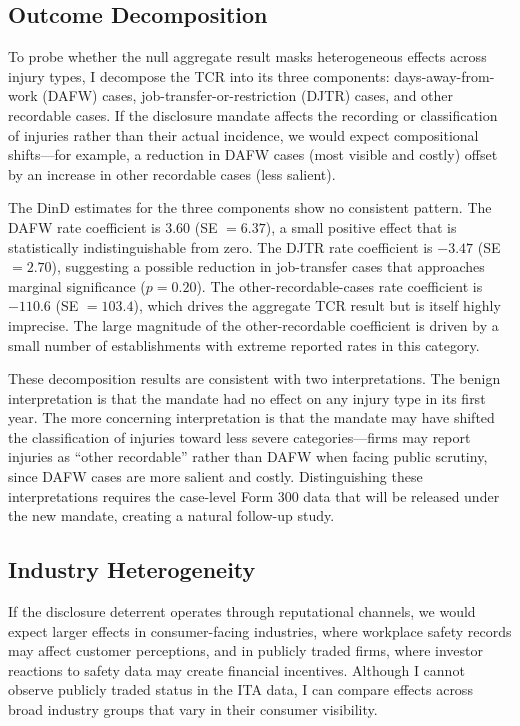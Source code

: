 \documentclass[12pt]{article}
\begin{document}



\subsection{Outcome Decomposition}

To probe whether the null aggregate result masks heterogeneous effects across injury types, I decompose the TCR into its three components: days-away-from-work (DAFW) cases, job-transfer-or-restriction (DJTR) cases, and other recordable cases. If the disclosure mandate affects the recording or classification of injuries rather than their actual incidence, we would expect compositional shifts---for example, a reduction in DAFW cases (most visible and costly) offset by an increase in other recordable cases (less salient).

The DinD estimates for the three components show no consistent pattern. The DAFW rate coefficient is $3.60$ (SE $= 6.37$), a small positive effect that is statistically indistinguishable from zero. The DJTR rate coefficient is $-3.47$ (SE $= 2.70$), suggesting a possible reduction in job-transfer cases that approaches marginal significance ($p = 0.20$). The other-recordable-cases rate coefficient is $-110.6$ (SE $= 103.4$), which drives the aggregate TCR result but is itself highly imprecise. The large magnitude of the other-recordable coefficient is driven by a small number of establishments with extreme reported rates in this category.

These decomposition results are consistent with two interpretations. The benign interpretation is that the mandate had no effect on any injury type in its first year. The more concerning interpretation is that the mandate may have shifted the classification of injuries toward less severe categories---firms may report injuries as ``other recordable'' rather than DAFW when facing public scrutiny, since DAFW cases are more salient and costly. Distinguishing these interpretations requires the case-level Form 300 data that will be released under the new mandate, creating a natural follow-up study.

\subsection{Industry Heterogeneity}

If the disclosure deterrent operates through reputational channels, we would expect larger effects in consumer-facing industries, where workplace safety records may affect customer perceptions, and in publicly traded firms, where investor reactions to safety data may create financial incentives. Although I cannot observe publicly traded status in the ITA data, I can compare effects across broad industry groups that vary in their consumer visibility.
\end{document}
